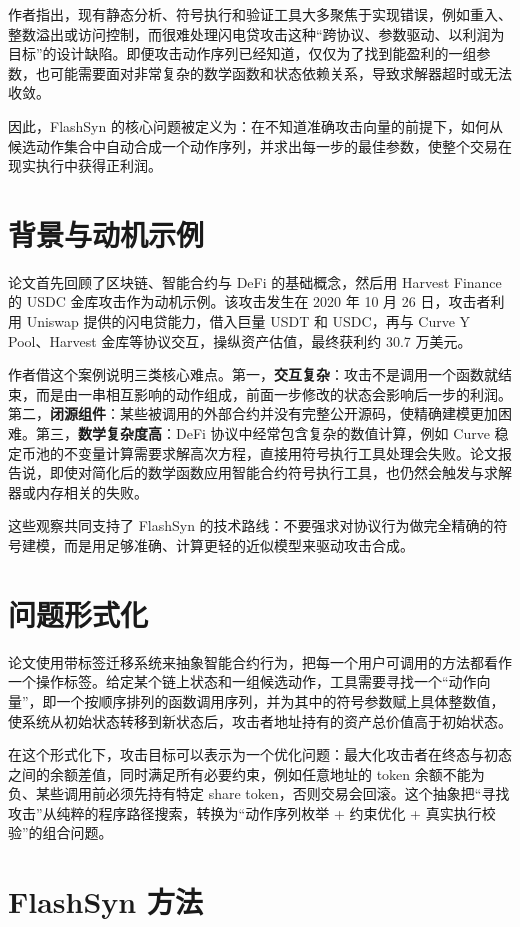 \documentclass[UTF8,11pt]{ctexart}
\begin{document}
作者指出，现有静态分析、符号执行和验证工具大多聚焦于实现错误，例如重入、整数溢出或访问控制，而很难处理闪电贷攻击这种“跨协议、参数驱动、以利润为目标”的设计缺陷。即便攻击动作序列已经知道，仅仅为了找到能盈利的一组参数，也可能需要面对非常复杂的数学函数和状态依赖关系，导致求解器超时或无法收敛。

因此，FlashSyn 的核心问题被定义为：在不知道准确攻击向量的前提下，如何从候选动作集合中自动合成一个动作序列，并求出每一步的最佳参数，使整个交易在现实执行中获得正利润。

\section{背景与动机示例}
论文首先回顾了区块链、智能合约与 DeFi 的基础概念，然后用 Harvest Finance 的 USDC 金库攻击作为动机示例。该攻击发生在 2020 年 10 月 26 日，攻击者利用 Uniswap 提供的闪电贷能力，借入巨量 USDT 和 USDC，再与 Curve Y Pool、Harvest 金库等协议交互，操纵资产估值，最终获利约 30.7 万美元。

作者借这个案例说明三类核心难点。第一，\textbf{交互复杂}：攻击不是调用一个函数就结束，而是由一串相互影响的动作组成，前面一步修改的状态会影响后一步的利润。第二，\textbf{闭源组件}：某些被调用的外部合约并没有完整公开源码，使精确建模更加困难。第三，\textbf{数学复杂度高}：DeFi 协议中经常包含复杂的数值计算，例如 Curve 稳定币池的不变量计算需要求解高次方程，直接用符号执行工具处理会失败。论文报告说，即使对简化后的数学函数应用智能合约符号执行工具，也仍然会触发与求解器或内存相关的失败。

这些观察共同支持了 FlashSyn 的技术路线：不要强求对协议行为做完全精确的符号建模，而是用足够准确、计算更轻的近似模型来驱动攻击合成。

\section{问题形式化}
论文使用带标签迁移系统来抽象智能合约行为，把每一个用户可调用的方法都看作一个操作标签。给定某个链上状态和一组候选动作，工具需要寻找一个“动作向量”，即一个按顺序排列的函数调用序列，并为其中的符号参数赋上具体整数值，使系统从初始状态转移到新状态后，攻击者地址持有的资产总价值高于初始状态。

在这个形式化下，攻击目标可以表示为一个优化问题：最大化攻击者在终态与初态之间的余额差值，同时满足所有必要约束，例如任意地址的 token 余额不能为负、某些调用前必须先持有特定 share token，否则交易会回滚。这个抽象把“寻找攻击”从纯粹的程序路径搜索，转换为“动作序列枚举 + 约束优化 + 真实执行校验”的组合问题。

\section{FlashSyn 方法}
\end{document}
